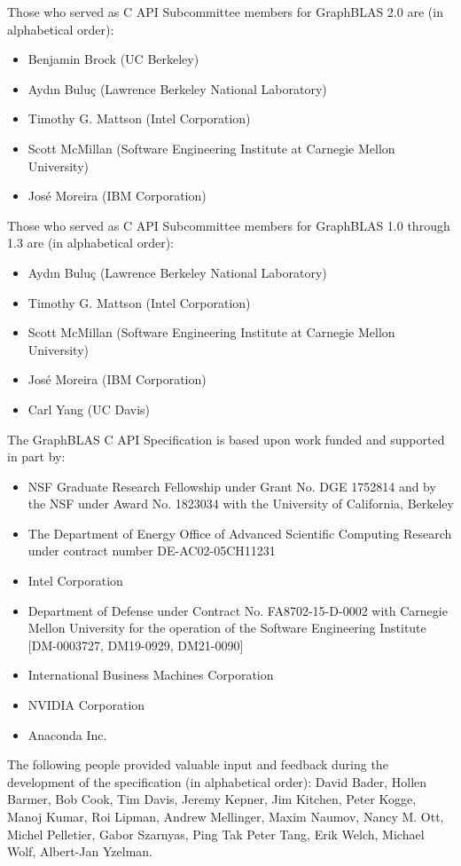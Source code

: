 \documentclass[11pt]{extbook}
\begin{document}
Those who served as C API Subcommittee members for GraphBLAS 2.0 are (in alphabetical order):
\begin{itemize}
\item Benjamin Brock (UC Berkeley)
\item Ayd\i n Bulu\c{c} (Lawrence Berkeley National Laboratory)
\item Timothy G. Mattson (Intel Corporation)
\item Scott McMillan (Software Engineering Institute at Carnegie Mellon University)
\item Jos\'e Moreira (IBM Corporation)
\end{itemize}

Those who served as C API Subcommittee members for GraphBLAS 1.0 through 1.3 are (in alphabetical order):
\begin{itemize}
\item Ayd\i n Bulu\c{c} (Lawrence Berkeley National Laboratory)
\item Timothy G. Mattson (Intel Corporation)
\item Scott McMillan (Software Engineering Institute at Carnegie Mellon University)
\item Jos\'e Moreira (IBM Corporation)
\item Carl Yang (UC Davis)
\end{itemize}

The GraphBLAS C API Specification is based upon work funded and supported in part by:
\begin{itemize}
\item NSF Graduate Research Fellowship under Grant No. DGE 1752814 and by the NSF under Award No. 1823034 with the University of California, Berkeley
\item The Department of Energy Office of Advanced Scientific Computing Research under contract number DE-AC02-05CH11231
\item Intel Corporation
\item Department of Defense under Contract No. FA8702-15-D-0002 with Carnegie Mellon University for the operation of the Software Engineering Institute [DM-0003727, DM19-0929, DM21-0090]
\item International Business Machines Corporation
\item NVIDIA Corporation
\item Anaconda Inc.
\end{itemize}

The following people provided valuable input and feedback during the development of the specification (in alphabetical order): David Bader,
Hollen Barmer, Bob Cook, Tim Davis, Jeremy Kepner, Jim Kitchen, Peter Kogge, Manoj Kumar, Roi Lipman, Andrew Mellinger,
Maxim Naumov, Nancy M. Ott, Michel Pelletier, Gabor Szarnyas, Ping Tak Peter Tang, Erik Welch, Michael Wolf, Albert-Jan Yzelman.
\vfill
\pagebreak
\end{document}
